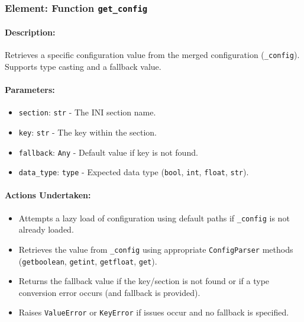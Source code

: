 \documentclass{article}
\begin{document}
\subsubsection{Element: Function \texttt{get\_config}}
\paragraph{Description:} Retrieves a specific configuration value from the merged configuration (\texttt{\_config}). Supports type casting and a fallback value.
\paragraph{Parameters:}
\begin{itemize}
    \item \texttt{section}: \texttt{str} - The INI section name.
    \item \texttt{key}: \texttt{str} - The key within the section.
    \item \texttt{fallback}: \texttt{Any} - Default value if key is not found.
    \item \texttt{data\_type}: \texttt{type} - Expected data type (\texttt{bool}, \texttt{int}, \texttt{float}, \texttt{str}).
\end{itemize}
\paragraph{Actions Undertaken:}
\begin{itemize}
    \item Attempts a lazy load of configuration using default paths if \texttt{\_config} is not already loaded.
    \item Retrieves the value from \texttt{\_config} using appropriate \texttt{ConfigParser} methods (\texttt{getboolean}, \texttt{getint}, \texttt{getfloat}, \texttt{get}).
    \item Returns the fallback value if the key/section is not found or if a type conversion error occurs (and fallback is provided).
    \item Raises \texttt{ValueError} or \texttt{KeyError} if issues occur and no fallback is specified.
\end{itemize}
\end{document}
